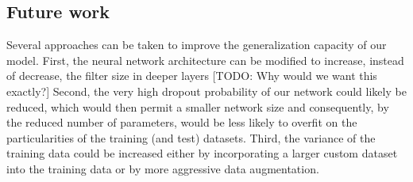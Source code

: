 \documentclass[a4paper]{article}
\begin{document}
\subsection{Future work}
Several approaches can be taken to improve the generalization capacity of our model. First, the neural network architecture can be modified to increase, instead of decrease, the filter size in deeper layers [TODO: Why would we want this exactly?] Second, the very high dropout probability of our network could likely be reduced, which would then permit a smaller network size and consequently, by the reduced number of parameters, would be less likely to overfit on the particularities of the training (and test) datasets. Third, the variance of the training data could be increased either by incorporating a larger custom dataset into the training data or by more aggressive data augmentation.

% 
\end{document}
